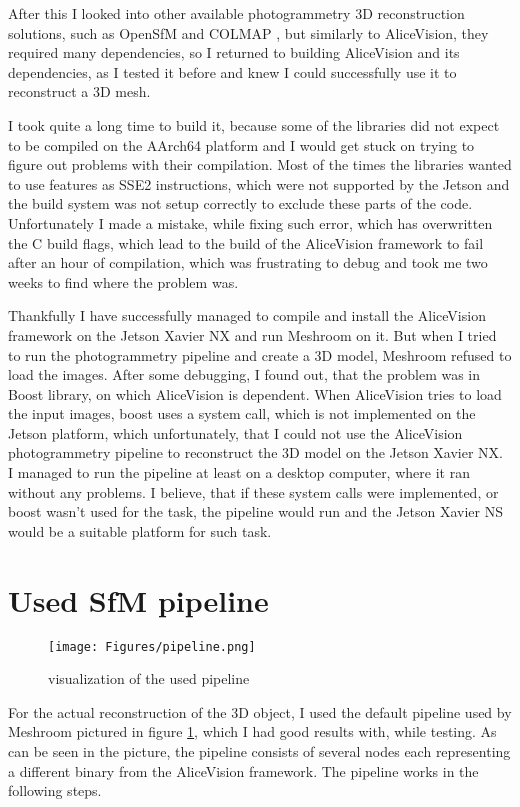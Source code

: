 After this I looked into other available photogrammetry 3D reconstruction solutions, such as OpenSfM \cite{opensfm} and COLMAP \cite{schoenberger2016sfm, schoenberger2016mvs}, but similarly to AliceVision, they required many dependencies, so I returned to building AliceVision and its dependencies, as I tested it before and knew I could successfully use it to reconstruct a 3D mesh.

I took quite a long time to build it, because some of the libraries did not expect to be compiled on the AArch64 platform and I would get stuck on trying to figure out  problems with their compilation.
Most of the times the libraries wanted to use features as SSE2 instructions, which were not supported by the Jetson and the build system was not setup correctly to exclude these parts of the code.
Unfortunately I made a mistake, while fixing such error, which has overwritten the C build flags, which lead to the build of the AliceVision framework to fail after an hour of compilation, which was frustrating to debug and took me two weeks to find where the problem was.

Thankfully I have successfully managed to compile and install the AliceVision framework on the Jetson Xavier NX and run Meshroom on it.
But when I tried to run the photogrammetry pipeline and create a 3D model, Meshroom refused to load the images.
After some debugging, I found out, that the problem was in Boost library, on which AliceVision is dependent.
When AliceVision tries to load the input images, boost uses a system call, which is not implemented on the Jetson platform, which unfortunately, that I could not use the AliceVision photogrammetry pipeline to reconstruct the 3D model on the Jetson Xavier NX.
I managed to run the pipeline at least on a desktop computer, where it ran without any problems.
I believe, that if these system calls were implemented, or boost wasn't used for the task, the pipeline would run and the Jetson Xavier NS would be a suitable platform for such task.

\section{Used SfM pipeline}
\begin{figure}[h!]
	\centering
	\texttt{[image: Figures/pipeline.png]}	
	\caption{visualization of the used pipeline}
	\label{Pipeline_vis}
\end{figure}

For the actual reconstruction of the 3D object, I used the default pipeline used by Meshroom pictured in figure \ref{Pipeline_vis}, which I had good results with, while testing.
As can be seen in the picture, the pipeline consists of several nodes each representing a different binary from the AliceVision framework.
The pipeline works in the following steps. \cite{alicevision_photogrammetry}

